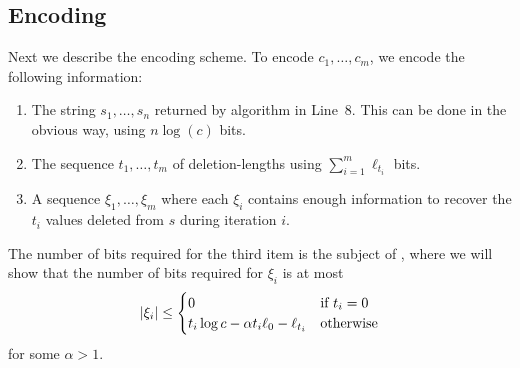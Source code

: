 \documentclass{patmorin}
\begin{document}

\subsection{Encoding}

Next we describe the encoding scheme.  To encode $c_1,\ldots,c_m$, we encode the following information:
\begin{enumerate}
  \item The string $s_1,\ldots,s_n$ returned by algorithm in Line~8. This can be done in the obvious way, using $n\log(c)$ bits.
  \item The sequence $t_1,\ldots,t_m$ of deletion-lengths using $\sum_{i=1}^m \ell_{t_i}$ bits.
  \item A sequence $\xi_1,\ldots,\xi_m$ where each $\xi_i$ contains enough information to recover the $t_i$ values deleted from $s$ during iteration $i$.
\end{enumerate}

The number of bits required for the third item is the subject of , where we will show that the number of bits required for $\xi_i$ is at most
\begin{equation}
   |\xi_i| 
   \le \begin{cases}
     0 & \text{if $t_i = 0$} \\
     t_i\log c - \alpha t_i\ell_0 - \ell_{t_i}  & \text{otherwise} \\
   \end{cases}  \eqlabel{xi-i}
\end{equation}
for some $\alpha > 1$.
\end{document}
